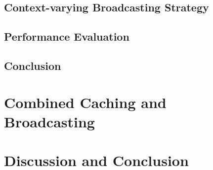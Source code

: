 \subsection{Context-varying Broadcasting Strategy}
\subsection{Performance Evaluation}
\subsection{Conclusion}
\section{Combined Caching and Broadcasting}
\section{Discussion and Conclusion}
